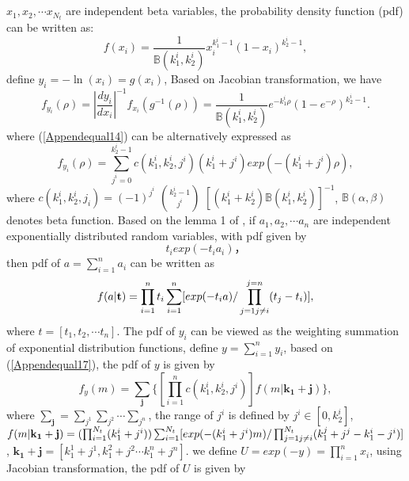 \documentclass[12pt, draftclsnofoot, onecolumn]{IEEEtran}
\begin{document}
\section{}
$x_{1}, x_{2}, \cdots x_{N_{t}}$ are independent beta variables, the probability density function (pdf) can be written as: 
\begin{equation}
f(x_{i})=\frac{1}{\mathbb{B}(k_{1}^{i}, k_{2}^{i})}x_{i}^{k_{1}^{i}-1}(1-x_{i})^{k_{2}^{i}-1},
\label{Appendequal13}
\end{equation}
define $y_{i}=-\ln(x_{i})=g(x_{i})$, Based on Jacobian transformation, we have 
\begin{equation}
f_{y_{i}}(\rho)=|\frac{dy_{i}}{dx_{i}}|^{-1}f_{x_{i}}(g^{-1}(\rho))=\frac{1}{\mathbb{B}(k_{1}^{i},k_{2}^{i})}e^{-k_{1}^{i}\rho}(1-e^{-\rho})^{k_{2}^{i}-1}.
\label{Appendequal14}
\end{equation}
where (\ref{Appendequal14}) can be alternatively expressed as \cite{bhargava1981distribution}
\begin{equation}
f_{y_{i}}(\rho)=\sum_{j^{i}=0}^{k_{2}^{i}-1}c(k_{1}^{i},k_{2}^{i}, j^{i})(k_{1}^{i}+j^{i})exp(-(k_{1}^{i}+j^{i})\rho),
\label{Appendequal15}
\end{equation} 
where $c(k_{1}^{i}, k_{2}^{i}, j_{i})=(-1)^{j^{i}}$ $k_{2}^{i}-1\choose j^{i}$ $[(k_{1}^{i}+k_{2}^{i})\mathbb{B}(k_{1}^{i},k_{2}^{i})]^{-1}$, $\mathbb{B}(\alpha, \beta)$ denotes beta function. Based on the lemma 1 of \cite{bhargava1981distribution}, if $a_{1}, a_{2}, \cdots a_{n}$ are independent exponentially distributed random variables, with pdf given by
\begin{equation}
t_{i}exp(-t_{i}a_{i})，
\label{Appendequal16}
\end{equation} 
then pdf of $a=\sum_{i=1}^{n}a_{i}$ can be written as
\begin{equation}
f(a|\mathbf{t})=\prod_{i=1}^{n}t_{i}\sum_{i=1}^{n}[exp(-t_{i}a)/\prod_{j=1\\ j\neq i}^{j=n}(t_{j}-t_{i})],
\label{Appendequal17}
\end{equation}
where $t=[t_{1}, t_{2}, \cdots t_{n}]$. The pdf of $y_{i}$ can be viewed as the weighting summation of exponential distribution functions, define $y=\sum_{i=1}^{n}y_{i}$, based on (\ref{Appendequal17}), the pdf of $y$ is given by
\begin{equation}
f_{y}(m)=\sum_{\mathbf{j}}\{[\prod_{i=1}^{n}c(k_{1}^{i},k_{2}^{i}, j^{i})]f(m|\mathbf{k_{1}}+\mathbf{j})\},
\label{Appendequal18}
\end{equation}
where $\sum_{\mathbf{j}}=\sum_{j^{1}}\sum_{j^{2}}\cdots \sum_{j^{n}}$, the range of $j^{i}$ is defined by $j^{i}\in [0, k_{2}^{i}]$, $f(m|\mathbf{k_{1}}+\mathbf{j})=(\prod_{i=1}^{N_{t}}(k_{1}^{i}+j^{i}))\sum_{i=1}^{N_{t}}[exp(-(k_{1}^{i}+j^{i})m)/\prod_{j=1\\ j\neq i}^{N_{t}}(k_{1}^{j}+j^{j}-k_{1}^{i}-j^{i})]$, $\mathbf{k_{1}}+\mathbf{j}=[k_{1}^{1}+j^{1}, k_{1}^{2}+j^{2} \cdots k_{1}^{n}+j^{n}]$. we define $U=exp(-y)=\prod_{i=1}^{n}x_{i}$, using Jacobian transformation, the pdf of $U$ is given by 
\end{document}
